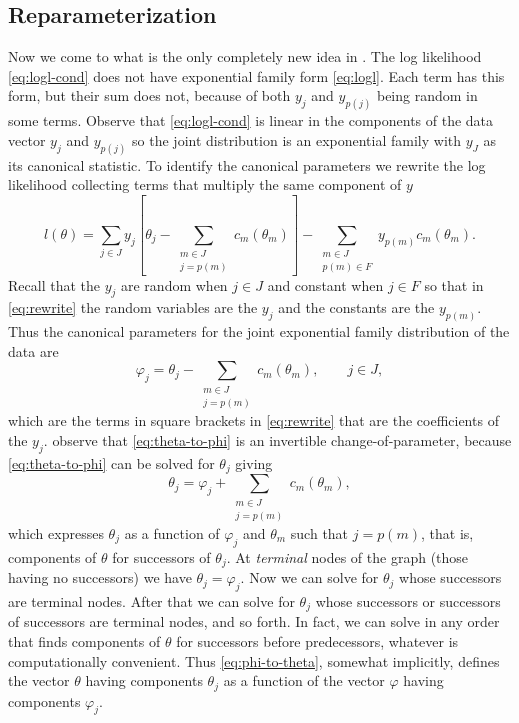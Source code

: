 \documentclass[11pt]{article}
\begin{document}
\subsection{Reparameterization} \label{sec:geyer-great-idea}

Now we come to what is the only completely new idea in \citet{aster1}.
The log likelihood \eqref{eq:logl-cond} does not have exponential family form
\eqref{eq:logl}.  Each term has this form, but their sum does not, because of
both $y_j$ and $y_{p(j)}$ being random in some terms.
Observe that
\eqref{eq:logl-cond} is linear in the components of the data
vector $y_j$ and $y_{p(j)}$ so the joint distribution
is an exponential family with $y_J$ as its canonical statistic.  To identify
the canonical parameters we rewrite the log likelihood collecting terms that
multiply the same component of $y$
\begin{equation} \label{eq:rewrite}
   l(\theta)
   =
   \sum_{j \in J} y_j \left[
   \theta_j - \sum_{\substack{m \in J \\ j = p(m)}} c_m(\theta_m) \right]
   -
   \sum_{\substack{m \in J \\ p(m) \in F}} y_{p(m)} c_m(\theta_m).
\end{equation}
Recall that the $y_j$ are random when $j \in J$ and constant when $j \in F$
so that in \eqref{eq:rewrite} the random variables are the $y_j$ and the
constants are the $y_{p(m)}$.  Thus the canonical parameters for the
joint exponential family distribution of the data are
\begin{equation} \label{eq:theta-to-phi}
   \varphi_j = \theta_j - \sum_{\substack{m \in J \\ j = p(m)}} c_m(\theta_m),
   \qquad j \in J,
\end{equation}
which are the terms in square brackets in \eqref{eq:rewrite} that are the
coefficients of the $y_j$.  \citet{aster1} observe that \eqref{eq:theta-to-phi}
is an invertible change-of-parameter, because \eqref{eq:theta-to-phi} can
be solved for $\theta_j$ giving
\begin{equation} \label{eq:phi-to-theta}
   \theta_j = \varphi_j + \sum_{\substack{m \in J \\ j = p(m)}} c_m(\theta_m),
\end{equation}
which expresses $\theta_j$ as a function of $\varphi_j$ and $\theta_m$ such
that $j = p(m)$, that is, components of $\theta$ for successors of $\theta_j$.
At \emph{terminal}
nodes of the graph (those having no successors) we have $\theta_j = \varphi_j$.
Now we can solve for $\theta_j$ whose successors are terminal nodes.
After that we can solve for $\theta_j$ whose successors or successors of
successors are terminal nodes, and so forth.
In fact, we can solve in any order
that finds components of $\theta$ for successors before predecessors,
whatever is computationally
convenient.  Thus \eqref{eq:phi-to-theta}, somewhat implicitly, defines
the vector $\theta$ having components $\theta_j$ as a function of
the vector $\varphi$ having components $\varphi_j$.
\end{document}
